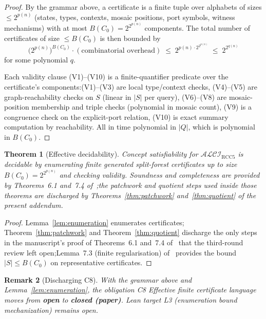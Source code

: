 \documentclass[11pt]{article}
\newtheorem{theorem}{Theorem}[section]
\newtheorem{remark}[theorem]{Remark}
\newcommand{\ALCIRCC}{\ensuremath{\mathcal{ALCI}_{\mathrm{RCC5}}}}
\newcommand{\OPEN}{\textcolor{black!60!orange}{\textbf{open}}}
\newcommand{\CLOSED}{\textcolor{black!70!green}{\textbf{closed (paper)}}}
\begin{document}
\begin{proof}
By the grammar above, a certificate is a finite tuple over alphabets
of sizes \(\le 2^{p(n)}\) (states, types, contexts, mosaic positions,
port symbols, witness mechanisms) with at most \(B(C_0) = 2^{2^{p(n)}}\)
components.  The total number of certificates of size \(\le B(C_0)\)
is then bounded by
\[
  \bigl(2^{p(n)}\bigr)^{B(C_0)} \cdot (\text{combinatorial overhead})
  \;\le\; 2^{p(n) \cdot 2^{2^{p(n)}}}
  \;\le\; 2^{2^{q(n)}}
\]
for some polynomial \(q\).

Each validity clause (V1)--(V10) is a finite-quantifier predicate
over the certificate's components:\@ (V1)--(V3) are local
type/context checks, (V4)--(V5) are graph-reachability checks on
\(S\) (linear in \(|S|\) per query), (V6)--(V8) are mosaic-position
membership and triple checks (polynomial in mosaic count), (V9) is a
congruence check on the explicit-port relation, (V10) is exact
summary computation by reachability.  All in time polynomial in
\(|Q|\), which is polynomial in \(B(C_0)\).
\end{proof}

\begin{theorem}[Effective decidability]\label{thm:decidability}
Concept satisfiability for \(\ALCIRCC\) is decidable by enumerating
finite generated split-forest certificates up to size \(B(C_0) =
2^{2^{p(n)}}\) and checking validity.  Soundness and completeness
are provided by Theorems~6.1 and~7.4 of~\cite{repaired};\@ the
patchwork and quotient steps used inside those theorems are
discharged by Theorems~\ref{thm:patchwork} and~\ref{thm:quotient} of
the present addendum.
\end{theorem}

\begin{proof}
Lemma~\ref{lem:enumeration} enumerates certificates;
Theorem~\ref{thm:patchwork} and Theorem~\ref{thm:quotient} discharge
the only steps in the manuscript's proof of
Theorems~6.1 and~7.4 of~\cite{repaired} that the third-round
review left open;\@ Lemma~7.3 (finite regularisation)
of~\cite{repaired} provides the bound \(|S| \le B(C_0)\) on
representative certificates.
\end{proof}

\begin{remark}[Discharging C8]
With the grammar above and Lemma~\ref{lem:enumeration}, the
obligation \emph{C8 Effective finite certificate language} moves
from \OPEN{} to \CLOSED{}.  Lean target L3 (enumeration bound
mechanization) remains open.
\end{remark}
\end{document}
